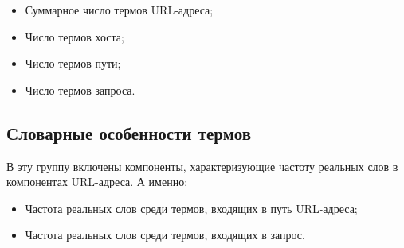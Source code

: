 \begin{itemize}
\item Суммарное число термов URL-адреса;
\item Число термов хоста;
\item Число термов пути;
\item Число термов запроса.
\end{itemize}

\subsection*{Словарные особенности термов}

В эту группу включены компоненты, характеризующие частоту реальных слов в компонентах URL-адреса. А именно:

\begin{itemize}
\item Частота реальных слов среди термов, входящих в путь URL-адреса;
\item Частота реальных слов среди термов, входящих в запрос.
\end{itemize}
